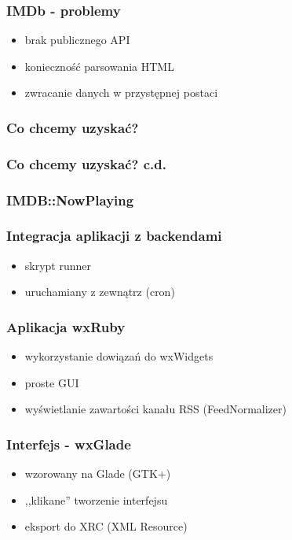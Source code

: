 \documentclass[12t]{beamer}
\begin{document}
\begin{frame}
  \frametitle{IMDb - problemy}
  \begin{itemize}
  \item brak publicznego API
  \item konieczność parsowania HTML
  \item zwracanie danych w przystępnej postaci
  \end{itemize}
\end{frame}

\begin{frame}[fragile]
  \frametitle{Co chcemy uzyskać?}
  
\end{frame}

\begin{frame}[fragile]
  \frametitle{Co chcemy uzyskać? c.d.}
  
\end{frame}

\begin{frame}[fragile]
  \frametitle{IMDB::NowPlaying}
  \begin{footnotesize}
    
  \end{footnotesize}
\end{frame}

\begin{frame}[fragile]
  \frametitle{Integracja aplikacji z backendami}
  \begin{itemize}
  \item skrypt runner
  \item uruchamiany z zewnątrz (cron)
  \end{itemize}
\end{frame}

\begin{frame}
  \frametitle{Aplikacja wxRuby}
  \begin{itemize}
  \item wykorzystanie dowiązań do wxWidgets
  \item proste GUI
  \item wyświetlanie zawartości kanału RSS (FeedNormalizer)
  \end{itemize}
\end{frame}

\begin{frame}
  \frametitle{Interfejs - wxGlade}
  \begin{itemize}
  \item wzorowany na Glade (GTK+)
  \item ,,klikane'' tworzenie interfejsu
  \item eksport do XRC (XML Resource)
  \end{itemize}
\end{frame}
\end{document}
